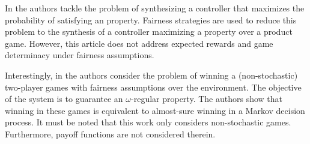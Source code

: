 	In \cite{DBLP:conf/ifipTCS/BolligC04} the authors tackle the problem of synthesizing a controller that maximizes the probability of satisfying an {\LTL} property. Fairness strategies are used to reduce this problem to the synthesis of a  controller maximizing a {\PCTL} property over a product game. However, this article does not address expected rewards and game determinacy under fairness assumptions. 
	
	Interestingly, in \cite{DBLP:conf/fossacs/AsarinCV10} the authors consider the problem of winning a (non-stochastic) two-player games with fairness assumptions over the environment. The objective of the system is to guarantee an $\omega$-regular property. The authors show that winning in these games is equivalent to almost-sure winning in a Markov decision process. It must be noted that this work only considers non-stochastic games.  Furthermore, payoff functions are not considered therein.


